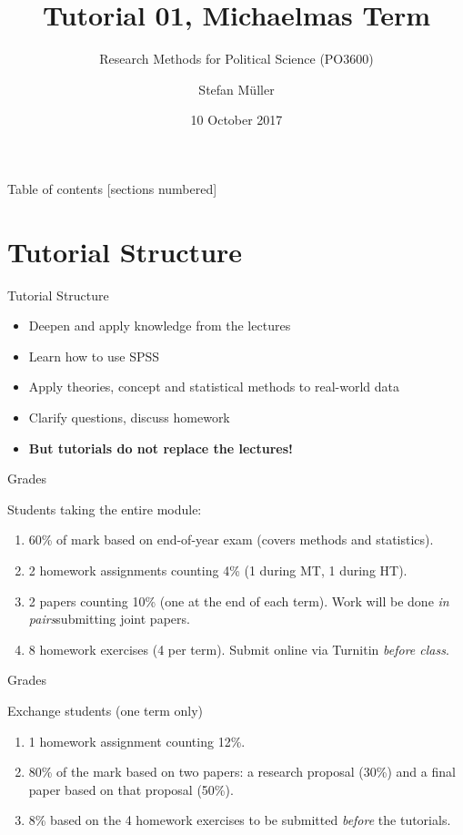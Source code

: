 \documentclass[10pt]{beamer}
\title{Tutorial 01, Michaelmas Term}
\subtitle{Research Methods for Political Science (PO3600)}
\date{10 October 2017}
\author{Stefan Müller}
\institute{Trinity College Dublin \\ \url{http://muellerstefan.net/research-methods}}
\begin{document}
\maketitle

\begin{frame}{Table of contents}
  [sections numbered]
  \tableofcontents%
\end{frame}

\section{Tutorial Structure}
\begin{frame}{Tutorial Structure}

\begin{itemize}
\item Deepen and apply knowledge from the lectures
\item Learn how to use SPSS
\item Apply theories, concept and statistical methods to real-world data
\item Clarify questions, discuss homework
\item \textbf{But tutorials do not replace the lectures!}
\end{itemize}

\end{frame}

\begin{frame}{Grades}

Students taking the entire module:

\begin{enumerate}
\item 60\% of mark based on end-of-year exam (covers methods and statistics).
\item 2 homework assignments counting 4\% (1 during MT, 1 during HT).
\item 2 papers counting 10\% (one at the end of each term). Work will be done \textit{in pairs}submitting joint papers.
\item 8 homework exercises (4 per term). Submit online via Turnitin \textit{before class}.
\end{enumerate}
\end{frame}

\begin{frame}{Grades}

Exchange students (one term only)
\begin{enumerate}
\item 1 homework assignment counting 12\%.
\item 80\% of the mark based on two papers: a research proposal (30\%) and a final paper based on that proposal (50\%).
\item 8\% based on the 4 homework exercises to be submitted \textit{before} the tutorials.
\end{enumerate}
\end{frame}
\end{document}
